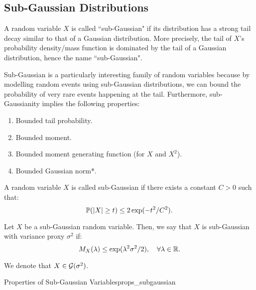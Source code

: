 \subsection{Sub-Gaussian Distributions}
A random variable $X$ is called ``sub-Gaussian" if its distribution has a strong tail decay similar to that of a Gaussian distribution. More precisely, the tail of $X$'s probability density/mass function is dominated by the tail of a Gaussian distribution, hence the name ``sub-Gaussian".

\noindent\newline Sub-Gaussian is a particularly interesting family of random variables because by modelling random events using sub-Gaussian distributions, we can bound the probability of very rare events happening at the tail. Furthermore, sub-Gaussianity implies the following properties:
\begin{enumerate}[label=(\roman*)]
	\item Bounded tail probability.
	\item Bounded moment.
	\item Bounded moment generating function (for $X$ and $X^2$).
	\item Bounded Gaussian norm*.
\end{enumerate} 

\begin{definition}
	A random variable $X$ is called sub-Gaussian if there exists a constant $C>0$ such that:
	\begin{equation}
		\mathbb{P}(|X|\ge t) \le 2\exp(-t^2/C^2).	
	\end{equation} 
\end{definition} 

\begin{definition}
	Let $X$ be a sub-Gaussian random variable. Then, we say that $X$ is sub-Gaussian with variance proxy $\sigma^2$ if:
	\begin{equation}
		M_X(\lambda) \le \exp(\lambda^2\sigma^2/2), \quad \forall \lambda\in\mathbb{R}.	
	\end{equation} 

	\noindent We denote that $X\in\mathcal{G}(\sigma^2)$.
\end{definition} 

\begin{proposition}{Properties of Sub-Gaussian Variables}{props_subgaussian}
	
\end{proposition} 